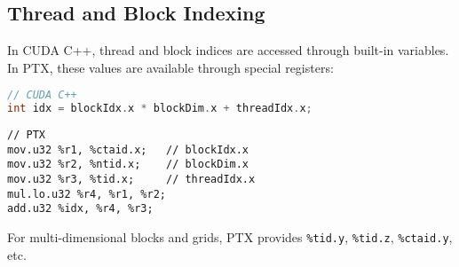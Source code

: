 \subsection{Thread and Block Indexing}

In CUDA C++, thread and block indices are accessed through built-in variables. In PTX, these values are available through special registers:

\begin{lstlisting}[language=C++]
// CUDA C++
int idx = blockIdx.x * blockDim.x + threadIdx.x;
\end{lstlisting}

\begin{lstlisting}[style=ptx]
// PTX
mov.u32 %r1, %ctaid.x;   // blockIdx.x
mov.u32 %r2, %ntid.x;    // blockDim.x
mov.u32 %r3, %tid.x;     // threadIdx.x
mul.lo.u32 %r4, %r1, %r2;
add.u32 %idx, %r4, %r3;
\end{lstlisting}

For multi-dimensional blocks and grids, PTX provides \texttt{\%tid.y}, \texttt{\%tid.z}, \texttt{\%ctaid.y}, etc.

